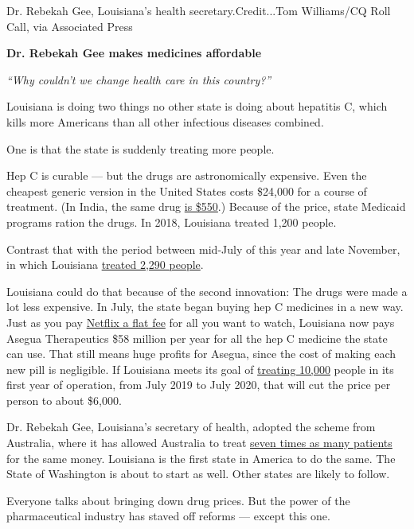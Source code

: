 Dr. Rebekah Gee, Louisiana's health secretary.Credit...Tom Williams/CQ
Roll Call, via Associated Press

\textbf{Dr. Rebekah Gee makes medicines affordable}

\emph{``Why couldn't we change health care in this country?''}

Louisiana is doing two things no other state is doing about hepatitis C,
which kills more Americans than all other infectious diseases combined.

One is that the state is suddenly treating more people.

Hep C is curable --- but the drugs are astronomically expensive. Even
the cheapest generic version in the United States costs \$24,000 for a
course of treatment. (In India, the same drug
\href{https://www.generichepatitiscdrugs.com/}{is \$550}.) Because of
the price, state Medicaid programs ration the drugs. In 2018, Louisiana
treated 1,200 people.

Contrast that with the period between mid-July of this year and late
November, in which Louisiana
\href{http://www.ldh.la.gov/index.cfm/newsroom/detail/5357}{treated
2,290 people}.

Louisiana could do that because of the second innovation: The drugs were
made a lot less expensive. In July, the state began buying hep C
medicines in a new way. Just as you pay
\href{https://www.nytimes3xbfgragh.onion/2019/03/05/opinion/can-netflix-show-americans-how-to-cut-the-cost-of-drugs.html}{Netflix
a flat fee} for all you want to watch, Louisiana now pays Asegua
Therapeutics \$58 million per year for all the hep C medicine the state
can use. That still means huge profits for Asegua, since the cost of
making each new pill is negligible. If Louisiana meets its goal of
\href{https://www.nola.com/news/healthcare_hospitals/article_ddf84210-a8d4-11e9-ae1b-b7037c312d9a.html}{treating
10,000} people in its first year of operation, from July 2019 to July
2020, that will cut the price per person to about \$6,000.

Dr. Rebekah Gee, Louisiana's secretary of health, adopted the scheme
from Australia, where it has allowed Australia to treat
\href{https://www.nejm.org/doi/full/10.1056/NEJMp1813728}{seven times as
many patients} for the same money. Louisiana is the first state in
America to do the same. The State of Washington is about to start as
well. Other states are likely to follow.

Everyone talks about bringing down drug prices. But the power of the
pharmaceutical industry has staved off reforms --- except this one.

